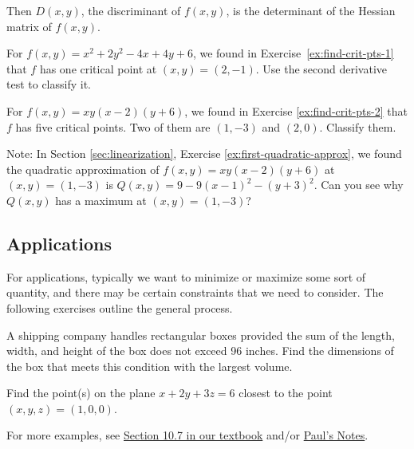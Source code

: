 Then $D(x,y)$, the discriminant of $f(x,y)$, is the determinant of the Hessian matrix of $f(x,y)$.

\begin{ex}
    For $f(x,y)=x^2+2y^2-4x+4y+6$, we found in Exercise~\ref{ex:find-crit-pts-1} that $f$ has one critical point at $(x,y)=(2,-1)$. Use the second derivative test to classify it.
\end{ex}

\vfill

\begin{ex}
    For $f(x,y)=xy(x-2)(y+6)$, we found in Exercise \ref{ex:find-crit-pts-2} that $f$ has five critical points. Two of them are $(1,-3)$ and $(2,0)$. Classify them.
\end{ex}

\vfill\vfill

Note: In Section \ref{sec:linearization}, Exercise \ref{ex:first-quadratic-approx}, we found the quadratic approximation of $f(x,y)=xy(x-2)(y+6)$ at $(x,y)=(1,-3)$ is $Q(x,y)=9-9(x-1)^2-(y+3)^2$. Can you see why $Q(x,y)$ has a maximum at $(x,y)=(1,-3)$?

\pagebreak 

\subsection{Applications}
For applications, typically we want to minimize or maximize some sort of quantity, and there may be certain constraints that we need to consider. The following exercises outline the general process.
\begin{ex}
    A shipping company handles rectangular boxes provided the sum of the length, width, and height of the box does not exceed 96 inches. Find the dimensions of the box that meets this condition with the largest volume.
\end{ex}
\pagebreak 
\begin{ex}
    Find the point(s) on the plane $x+2y+3z=6$ closest to the point $(x,y,z)=(1,0,0)$.
\end{ex}

\vfill 
For more examples, see \href{https://activecalculus.org/vector/S-10-7-Optimization.html}{Section 10.7 in our textbook} and/or \href{https://tutorial.math.lamar.edu/Classes/CalcIII/RelativeExtrema.aspx}{Paul's Notes}.
